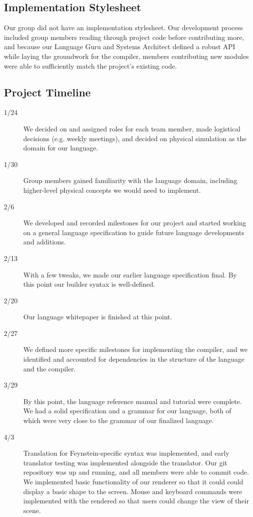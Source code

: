 \subsection{Implementation Stylesheet}
Our group did not have an implementation stylesheet. Our development
process included group members reading through project code before
contributing more, and because our Language Guru and Systems Architect
defined a robust API while laying the groundwork for the compiler,
members contributing new modules were able to sufficiently match the
project’s existing code.

\subsection{Project Timeline}
\begin{description}
\item[1/24] We decided on and assigned roles for each team member,
  made logistical decisions (e.g. weekly meetings), and decided on
  physical simulation as the domain for our language.

\item[1/30] Group members gained familiarity with the language domain,
  including higher-level physical concepts we would need to implement.

\item[2/6] We developed and recorded milestones for our project and
  started working on a general language specification to guide future
  language developments and additions.

\item[2/13] With a few tweaks, we made our earlier language
  specification final. By this point our builder syntax is
  well-defined.

\item[2/20] Our language whitepaper is finished at this point.

\item[2/27] We defined more specific milestones for implementing the
  compiler, and we identified and accounted for dependencies in the
  structure of the language and the compiler.

\item[3/29] By this point, the language reference manual and tutorial
  were complete. We had a solid specification and a grammar for our
  language, both of which were very close to the grammar of our
  finalized language.

\item[4/3] Translation for Feynstein-specific syntax was implemented,
  and early translator testing was implemented alongside the
  translator. Our git repository was up and running, and all members
  were able to commit code. We implemented basic functionality of our
  renderer so that it could could display a basic shape to the
  screen. Mouse and keyboard commands were implemented with the
  rendered so that users could change the view of their scene.


\end{description}
